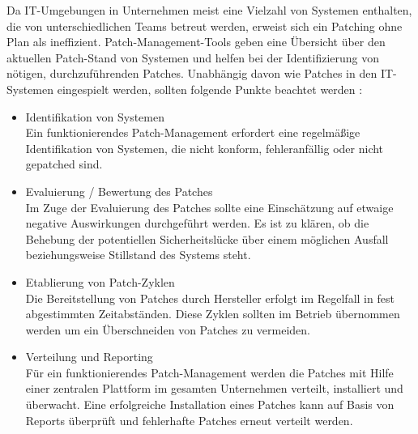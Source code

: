 \bigbreak
Da IT-Umgebungen in Unternehmen meist eine Vielzahl von Systemen enthalten, die von unterschiedlichen Teams betreut werden, erweist sich ein Patching ohne Plan als ineffizient. Patch-Management-Tools geben eine Übersicht über den aktuellen Patch-Stand von Systemen und helfen bei der Identifizierung von nötigen, durchzuführenden Patches. Unabhängig davon wie Patches in den IT-Systemen eingespielt werden, sollten folgende Punkte beachtet werden \autocite{redhat}:
\begin{itemize}
    \item Identifikation von Systemen\\
    Ein funktionierendes Patch-Management erfordert eine regelmäßige Identifikation von Systemen, die nicht konform, fehleranfällig oder nicht gepatched sind. 
    \item Evaluierung / Bewertung des Patches\\
    Im Zuge der Evaluierung des Patches sollte eine Einschätzung auf etwaige negative Auswirkungen durchgeführt werden. Es ist zu klären, ob die Behebung der potentiellen Sicherheitslücke über einem möglichen Ausfall beziehungsweise Stillstand des Systems steht.
    \item Etablierung von Patch-Zyklen\\
    Die Bereitstellung von Patches durch Hersteller erfolgt im Regelfall in fest abgestimmten Zeitabständen. Diese Zyklen sollten im Betrieb übernommen werden um ein Überschneiden von Patches zu vermeiden.
    \item Verteilung und Reporting\\
    Für ein funktionierendes Patch-Management werden die Patches mit Hilfe einer zentralen Plattform im gesamten Unternehmen verteilt, installiert und überwacht. Eine erfolgreiche Installation eines Patches kann auf Basis von Reports überprüft und fehlerhafte Patches erneut verteilt werden. 
\end{itemize}


